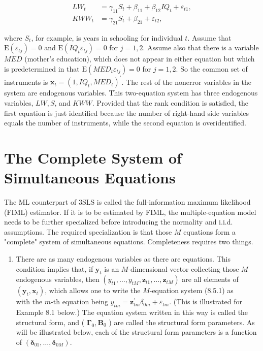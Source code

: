 \documentclass[10pt]{article}
\begin{document}
\begin{align*}
L W_{t} & =\gamma_{11} S_{t}+\beta_{11}+\beta_{12} I Q_{t}+\varepsilon_{t 1},  \tag{8.5.6}\\
K W W_{t} & =\gamma_{21} S_{t}+\beta_{21}+\varepsilon_{t 2}, \tag{8.5.7}
\end{align*}


where $S_{t}$, for example, is years in schooling for individual $t$. Assume that $\mathrm{E}\left(\varepsilon_{t j}\right)=0$ and $\mathrm{E}\left(I Q_{t} \varepsilon_{t j}\right)=0$ for $j=1,2$. Assume also that there is a variable $M E D$ (mother's education), which does not appear in either equation but which is predetermined in that $\mathrm{E}\left(M E D_{t} \varepsilon_{t j}\right)=0$ for $j=1,2$. So the common set of instruments is $\mathbf{x}_{t}=\left(1, I Q_{t}, M E D_{t}\right)^{\prime}$. The rest of the nonerror variables in the system are endogenous variables. This two-equation system has three endogenous variables, $L W, S$, and $K W W$. Provided that the rank condition is satisfied, the first equation is just identified because the number of right-hand side variables equals the number of instruments, while the second equation is overidentified.

\section*{The Complete System of Simultaneous Equations}
The ML counterpart of 3SLS is called the full-information maximum likelihood (FIML) estimator. If it is to be estimated by FIML, the multiple-equation model needs to be further specialized before introducing the normality and i.i.d. assumptions. The required specialization is that those $M$ equations form a "complete" system of simultaneous equations. Completeness requires two things.

\begin{enumerate}
  \item There are as many endogenous variables as there are equations. This condition implies that, if $\mathbf{y}_{t}$ is an $M$-dimensional vector collecting those $M$ endogenous variables, then $\left(y_{t 1}, \ldots, y_{t M}, \mathbf{z}_{t 1}, \ldots, \mathbf{z}_{t M}\right)$ are all elements of $\left(\mathbf{y}_{t}, \mathbf{x}_{t}\right)$, which allows one to write the $M$-equation system (8.5.1) as\\
with the $m$-th equation being $y_{t m}=\mathbf{z}_{t m}^{\prime} \delta_{0 m}+\varepsilon_{t m}$. (This is illustrated for Example 8.1 below.) The equation system written in this way is called the structural form, and ( $\boldsymbol{\Gamma}_{0}, \mathbf{B}_{0}$ ) are called the structural form parameters. As will be illustrated below, each of the structural form parameters is a function of $\left(\boldsymbol{\delta}_{01}, \ldots, \boldsymbol{\delta}_{0 M}\right)$.
\end{enumerate}
\end{document}
